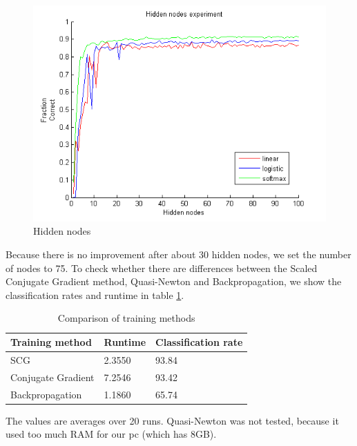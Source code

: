 \documentclass{article}
\begin{document}
\begin{figure}[H]
	\centering
		\includegraphics[scale=0.8]{hidden_nodes.png}
    \caption{Hidden nodes}
    \label{fig:hidden_nodes}
\end{figure}

Because there is no improvement after about 30 hidden nodes, we set the number of nodes to 75. To check whether there are differences between the Scaled Conjugate Gradient method, Quasi-Newton and Backpropagation, we show the classification rates and runtime in table \ref{tab:tm}.

\begin{table}[H]
	\centering
	\begin{tabular}{| l | l | l |}
		\hline
		Training method & Runtime & Classification rate \\ \hline
		SCG & 2.3550 & 93.84 \\ \hline
		Conjugate Gradient & 7.2546 & 93.42\\ \hline
		Backpropagation & 1.1860 & 65.74 \\ \hline
	\end{tabular}
	\caption{Comparison of training methods}
	\label{tab:tm}
\end{table}

The values are averages over 20 runs. Quasi-Newton was not tested, because it used too much RAM for our pc (which has 8GB). 
\end{document}
